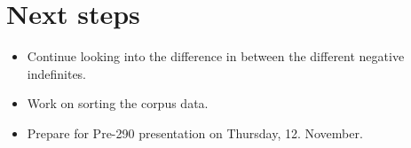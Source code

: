 \documentclass[12pt, letterpaper]{article}
\begin{document}
\section{Next steps} \label{sec:NEXT}
\begin{itemize}
	\item Continue looking into the difference in between the different negative indefinites.
	\item Work on sorting the corpus data.
	\item Prepare for Pre-290 presentation on Thursday, 12. November.
\end{itemize}



\printbibliography
\end{document}
